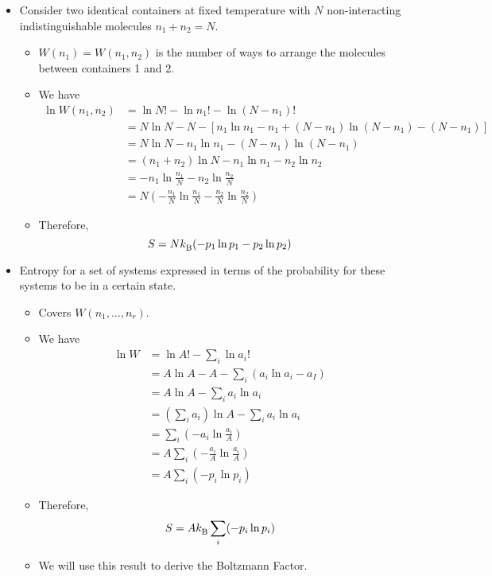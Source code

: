 \documentclass[../notes.tex]{subfiles}
\begin{document}
\begin{itemize}
    \item Consider two identical containers at fixed temperature with $N$ non-interacting indistinguishable molecules $n_1+n_2=N$.
    \begin{itemize}
        \item $W(n_1)=W(n_1,n_2)$ is the number of ways to arrange the molecules between containers 1 and 2.
        \item We have
        \begin{align*}
            \ln W(n_1,n_2) &= \ln N!-\ln n_1!-\ln(N-n_1)!\\
            &= N\ln N-N-[n_1\ln n_1-n_1+(N-n_1)\ln(N-n_1)-(N-n_1)]\\
            &= N\ln N-n_1\ln n_1-(N-n_1)\ln(N-n_1)\\
            &= (n_1+n_2)\ln N-n_1\ln n_1-n_2\ln n_2\\
            &= -n_1\ln\frac{n_1}{N}-n_2\ln\frac{n_2}{N}\\
            &= N\left( -\frac{n_1}{N}\ln\frac{n_1}{N}-\frac{n_2}{N}\ln\frac{n_2}{N} \right)
        \end{align*}
        \item Therefore,
        \begin{equation*}
            S = N{k_\text{B}^{}}(-p_1\ln p_1-p_2\ln p_2)
        \end{equation*}
    \end{itemize}
    \item Entropy for a set of systems expressed in terms of the probability for these systems to be in a certain state.
    \begin{itemize}
        \item Covers $W(n_1,\dots,n_r)$.
        \item We have
        \begin{align*}
            \ln W &= \ln A!-\sum_i\ln a_i!\\
            &= A\ln A-A-\sum_i(a_i\ln a_i-a_I)\\
            &= A\ln A-\sum_i a_i\ln a_i\\
            &= \left( \sum_ia_i \right)\ln A-\sum_ia_i\ln a_i\\
            &= \sum_i\left( -a_i\ln\frac{a_i}{A} \right)\\
            &= A\sum_i\left( -\frac{a_i}{A}\ln\frac{a_i}{A} \right)\\
            &= A\sum_i(-p_i\ln p_i)
        \end{align*}
        \item Therefore,
        \begin{equation*}
            S = A{k_\text{B}^{}}\sum_i(-p_i\ln p_i)
        \end{equation*}
        \item We will use this result to derive the Boltzmann Factor.
    \end{itemize}
\end{itemize}
\end{document}
